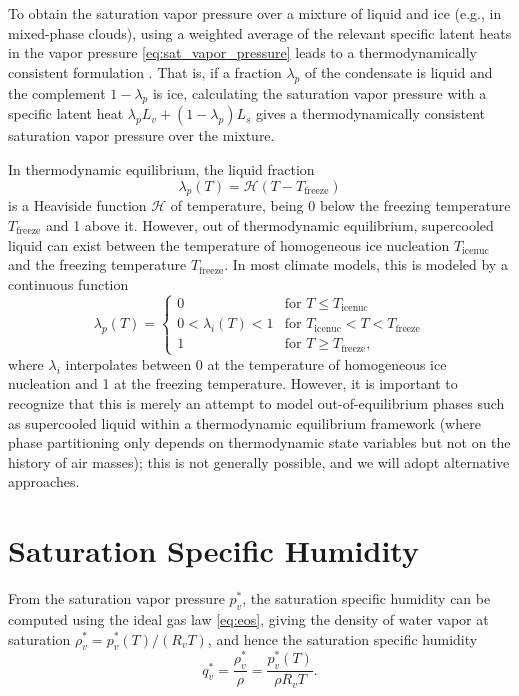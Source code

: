 \documentclass{report}
\begin{document}
To obtain the saturation vapor pressure over a mixture of liquid and ice (e.g., in mixed-phase clouds), using a weighted average of the relevant specific latent heats in the vapor pressure \eqref{eq:sat_vapor_pressure} leads to a thermodynamically consistent formulation \citep{Pressel15a}. That is, if a fraction $\lambda_p$ of the condensate is liquid and the complement $1-\lambda_p$ is ice, calculating the saturation vapor pressure with a specific latent heat $\lambda_p L_v + (1-\lambda_p)L_s$ gives a thermodynamically consistent saturation vapor pressure over the mixture. 

In thermodynamic equilibrium, the liquid fraction 
\begin{equation}\label{e:liquid_fraction}
    \lambda_p(T) = \mathcal{H}(T-T_{\mathrm{freeze}})
\end{equation} 
is a Heaviside function $\mathcal{H}$ of temperature, being 0 below the freezing temperature $T_{\mathrm{freeze}}$ and 1 above it. However, out of thermodynamic equilibrium, supercooled liquid can exist between the temperature of homogeneous ice nucleation $T_{\mathrm{icenuc}}$ and the freezing temperature $T_{\mathrm{freeze}}$. In most climate models, this is modeled by a continuous function 
\begin{equation}
    \lambda_p(T) = 
    \begin{cases}
    0 & \text{for } T\le T_{\mathrm{icenuc}}\\
    0<\lambda_i(T)<1 & \text{for } T_{\mathrm{icenuc}} < T <  T_{\mathrm{freeze}}\\
    1   & \text{for } T\ge T_{\mathrm{freeze}},
    \end{cases}
\end{equation} 
where $\lambda_i$ interpolates between 0 at the temperature of homogeneous ice nucleation and 1 at the freezing temperature. However, it is important to recognize that this is merely an attempt to model out-of-equilibrium phases such as supercooled liquid within a thermodynamic equilibrium framework (where phase partitioning only depends on thermodynamic state variables but not on the history of air masses); this is not generally possible, and we will adopt alternative approaches.

\section{Saturation Specific Humidity}
\label{sct:sat_spef_hum}
From the saturation vapor pressure $p_v^*$, the saturation specific humidity can be computed using the ideal gas law \eqref{eq:eos}, giving the density of water vapor at saturation $\rho_v^* = p_v^*(T)/(R_v T)$, and hence the saturation specific humidity 
\begin{equation}\label{eq:sat_shum}
     q_v^* = \frac{\rho_v^*}{\rho} = \frac{p_v^*(T)}{\rho R_v T}.
\end{equation}
\end{document}
